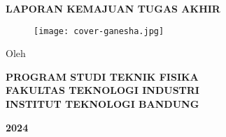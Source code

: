 \clearpage
\pagestyle{empty}

\begin{center}
    \smallskip
    
    \large \MakeUppercase{\bfseries \thetitle}
    
    \vfill
    
    \large \MakeUppercase{\bfseries Laporan Kemajuan Tugas Akhir}
    
    \vfill
    
    \begin{figure}[h]
        \centering
        \texttt{[image: cover-ganesha.jpg]}
    \end{figure}
    
    \vfill
    
    

    \small{
    Oleh

    \theauthor
    }

    \vfill

    \large
    \uppercase{
        \bfseries
        Program Studi Teknik Fisika \\
        Fakultas Teknologi Industri \\
        Institut Teknologi Bandung
    }
    
    \bfseries{2024}

    \vfill
    
\end{center}

\clearpage
